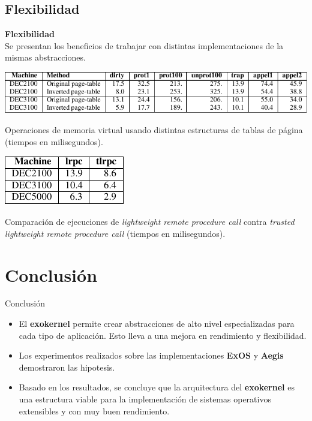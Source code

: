 \documentclass[10pt]{beamer}
\begin{document}
\subsection{Flexibilidad}

\begin{frame}
\textbf{Flexibilidad} \\[2em]
Se presentan los beneficios de trabajar con distintas implementaciones de la mismas abstracciones. 
\begin{table}
 \includegraphics[scale=0.8]{grafico-pages.pdf}
\caption{Operaciones de memoria virtual usando distintas estructuras de tablas de página (tiempos en milisegundos).}
\end{table}

\begin{table}
\includegraphics[scale=0.8]{grafico-tlrpc.pdf}
\caption{Comparación de ejecuciones de \emph{lightweight remote procedure call} contra \emph{trusted lightweight remote procedure call} (tiempos en milisegundos).}
\end{table}
\end{frame}

\section{Conclusión}

\begin{frame}{Conclusión}
 \begin{itemize}
  \item El \textbf{exokernel} permite crear abstracciones de alto nivel especializadas para cada tipo de aplicación. Esto lleva a una mejora en rendimiento y flexibilidad.
  \item Los experimentos realizados sobre las implementaciones \textbf{ExOS} y \textbf{Aegis} demostraron las hipotesis.
  \item Basado en los resultados, se concluye que la arquitectura del \textbf{exokernel} es una estructura viable para la implementación de sistemas operativos extensibles y con muy buen rendimiento.
\end{itemize}
\end{frame}



\end{document}
